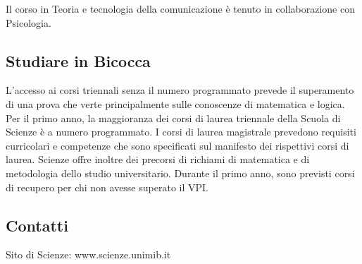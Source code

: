 Il corso in Teoria e tecnologia della comunicazione è tenuto in collaborazione con Psicologia. 

\subsection{Studiare in Bicocca}
L'accesso ai corsi triennali senza il numero programmato prevede il superamento di una prova che verte principalmente sulle conoscenze di matematica e logica. Per il primo anno, la maggioranza dei corsi di laurea triennale della Scuola di Scienze è a numero programmato. I corsi di laurea magistrale prevedono requisiti curricolari e competenze che sono specificati sul manifesto dei rispettivi corsi di laurea. 
Scienze offre inoltre dei precorsi di richiami di matematica e di metodologia dello studio universitario. Durante il primo anno, sono previsti corsi di recupero per chi non avesse superato il VPI. 

\subsection{Contatti}
Sito di Scienze: www.scienze.unimib.it 
